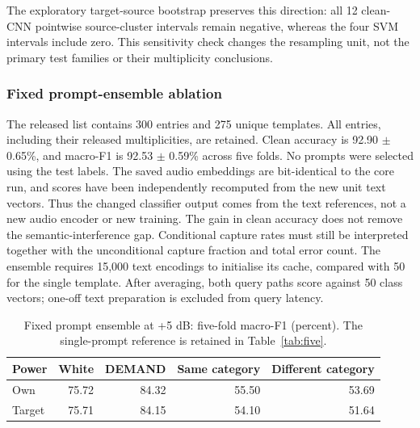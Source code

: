 The exploratory target-source bootstrap preserves this
direction: all 12 clean-CNN pointwise source-cluster intervals remain negative,
whereas the four SVM intervals include zero. This sensitivity check changes the
resampling unit, not the primary test families or their multiplicity conclusions.
\subsubsection*{Fixed prompt-ensemble ablation}
The released list contains 300 entries and 275 unique templates. All entries, including their released multiplicities, are retained. Clean accuracy is 92.90 $\pm$ 0.65\%, and macro-F1 is 92.53 $\pm$ 0.59\% across five folds. No prompts were selected using the test labels.
The saved audio embeddings are bit-identical to the core run, and
scores have been independently recomputed from the new unit text vectors. Thus
the changed classifier output comes from the text references, not a new audio
encoder or new training. The gain in clean accuracy does not remove the
semantic-interference gap. Conditional capture rates must still be interpreted
together with the unconditional capture fraction and total error count.
The ensemble requires 15,000 text encodings to initialise its cache, compared
with 50 for the single template. After averaging, both query paths score against
50 class vectors; one-off text preparation is excluded from query latency.
\begin{table}[htbp]\centering
\caption{Fixed prompt ensemble at +5 dB: five-fold macro-F1 (percent). The single-prompt reference is retained in Table~\ref{tab:five}.}
\begin{tabular}{lrrrr}\toprule Power & White & DEMAND & Same category & Different category\\\midrule
Own & 75.72 & 84.32 & 55.50 & 53.69 \\
Target & 75.71 & 84.15 & 54.10 & 51.64 \\
\bottomrule\end{tabular}\end{table}

